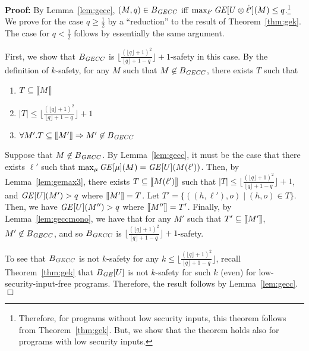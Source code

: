 \documentclass{llncs}
\newenvironment{proof}{\noindent\rm{\bf Proof:}}{\hbox{$\Box$}\vspace*{0.2\baselineskip}}
\newcommand{\aset}[1]{\{{#1}\}}
\newcommand{\sembrack}[1]{[\hspace*{-1.2pt}[#1]\hspace*{-1.2pt}]}
\begin{document}
\begin{proof}
By Lemma~\ref{lem:gecc}, $(M,q) \in B_{\it GECC}$ iff $\max_{\ell'}
{\it GE}[U\otimes \dot{\ell'}](M) \leq q$.\footnote{Therefore, for
  programs without low security inputs, this theorem follows from
  Theorem~\ref{thm:gek}.  But, we show that the theorem holds also for
  programs with low security inputs.}  We prove for the case $q \geq
\frac{1}{2}$ by a ``reduction'' to the result of Theorem~\ref{thm:gek}.
The case for $q < \frac{1}{2}$ follows by essentially the same
argument.

First, we show that $B_{\it GECC}$ is $\lfloor\frac{(\lfloor q\rfloor
  +1)^2}{\lfloor q\rfloor +1 -q} \rfloor +1$-safety in this case.  By
the definition of $k$-safety, for any $M$ such that $M\not\in B_{\it
  GECC}$, there exists $T$ such that
\begin{enumerate}
\item $T\subseteq \sembrack{M}$
\item $|T|\le \lfloor\frac{(\lfloor q\rfloor +1)^2}{\lfloor q\rfloor
    +1 -q} \rfloor +1$
\item $\forall M'.T\subseteq\sembrack{M'}\Rightarrow M'\not\in B_{\it
    GECC}$
\end{enumerate}
Suppose that $M\not\in B_{\it GECC}$.  By Lemma~\ref{lem:gecc}, it
must be the case that there exists $\ell'$ such that $\max_\mu {\it
  GE}[\mu](M)={\it GE}[U](M(\ell'))$.  Then, by
Lemma~\ref{lem:gemax3}, there exists $T\subseteq\sembrack{M(\ell')}$
such that $|T|\le \lfloor\frac{(\lfloor q\rfloor +1)^2}{\lfloor
  q\rfloor +1 -q} \rfloor +1$, and ${\it GE}[U](M')>q$ where
$\sembrack{M'}=T$.  Let $T' = \aset{((h,\ell'),o) \mid (h,o) \in T}$.
Then, we have ${\it GE}[U](M'')>q$ where $\sembrack{M''}=T'$.  Finally,
by Lemma~\ref{lem:geccmono}, we have that for any $M'$ such that
$T'\subseteq\sembrack{M'}$, $M'\not\in B_{\it GECC}$, and so $B_{\it
  GECC}$ is $\lfloor\frac{(\lfloor q\rfloor +1)^2}{\lfloor q\rfloor +1
  -q} \rfloor +1$-safety.

To see that $B_{\it GECC}$ is not $k$-safety for any $k \leq
\lfloor\frac{(\lfloor q\rfloor +1)^2}{\lfloor q\rfloor +1 -q}
\rfloor$, recall Theorem~\ref{thm:gek} that $B_{\it GE}[U]$ is not
$k$-safety for such $k$ (even) for low-security-input-free programs.
Therefore, the result follows by Lemma~\ref{lem:gecc}.
\end{proof}
\end{document}
